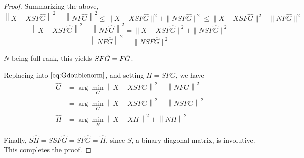 \documentclass{article}
\begin{document}
\begin{proof}
Summarizing the above,
$$\left \| X - XSF\hat G\right\| ^2  + \left \| NF\hat G\right \| ^2 \leq \| X - XSF\hat G \| ^2  + \| NSF\hat G \| ^2 \leq \| X - XSF\hat G \| ^2  + \| NF\hat G \| ^2$$
$$\left \| X - XSF\hat G\right\| ^2  + \left \| NF\hat G\right \| ^2 = \| X - XSF\hat G \| ^2  + \| NSF\hat G \| ^2$$
$$\left \| NF\hat G\right \| ^2 =  \| NSF\hat G \| ^2$$

$N$ being full rank, this yields $SF\hat G = F\Hat G$.

Replacing into $\eqref{eq:Gdoublenorm}$, and setting $H = SFG$, we have
\begin{align*}
	\hat G &=  \arg \min_G  \left \| X - XSFG\right \| ^2  + \left \| NFG\right \| ^2 \\
	&=   \arg \min_G \left \| X - XSFG\right \| ^2  + \left \| NSFG\right \| ^2 \\
	\hat H &=  \arg \min_H \left \| X - XH\right \| ^2  + \left \| NH\right \| ^2
	\label{eq:4}
\end{align*}

Finally, $S\hat H = S SF\hat G = SF\hat G = \hat H$, since $S$, a binary diagonal matrix, is involutive. This completes the proof.
\end{proof}
\end{document}
